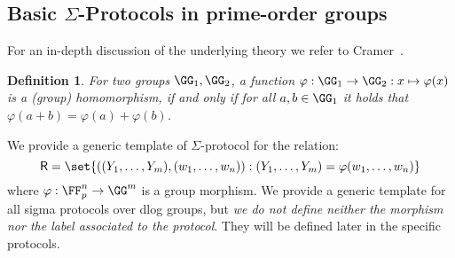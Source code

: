 \documentclass[11pt]{article}
\newtheorem{definition}{Definition}
\begin{document}

\subsection{Basic $\Sigma$-Protocols in prime-order groups}
For an in-depth discussion of the underlying theory we refer to Cramer~\cite{cramer97}.
 \begin{definition}
  For two groups $\GG_1,\GG_2$, a function $\varphi:\GG_1\to\GG_2:x\mapsto\varphi(x)$ is a \emph{(group) homomorphism}, if and only if for all $a,b\in\GG_1$ it holds that $\varphi(a+b)=\varphi(a)+\varphi(b)$.
\end{definition}




\label{sec:sigma-dlog}
We provide a generic template of $\Sigma$-protocol for the relation:
\[
  \relation=\set{((\statement_1,\dots,\statement_m),(w_1,\dots,w_n)) : (\statement_1,\dots,\statement_m)=\varphi(w_1,\dots,w_n)}
\]
where $\varphi:\FF_p^n\to\GG^m$ is a group morphism.
We provide a generic template for all sigma protocols over dlog groups, but \emph{we do not define neither the morphism nor the label associated to the protocol}.
They will be defined later in the specific protocols.
\end{document}
